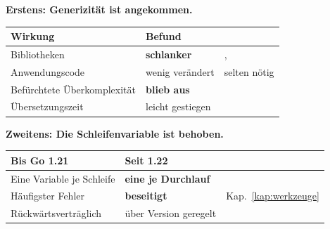 \begin{aktuell}
\textbf{Erstens: Generizität ist angekommen.}

\begin{center}
\renewcommand{\arraystretch}{1.45}
\begin{tabular}{@{}P{3.4cm}P{2.2cm}P{2.2cm}@{}}
\toprule
\textbf{Wirkung} & \textbf{Befund} & \\
\midrule
Bibliotheken & \textcolor{gruen}{\textbf{schlanker}} & , \\
Anwendungscode & \textcolor{mittel}{wenig verändert} & \textcolor{mittel}{selten nötig}\\
Befürchtete Überkomplexität & \textcolor{gruen}{\textbf{blieb aus}} & \\
Übersetzungszeit & \textcolor{mittel}{leicht gestiegen} & \\
\bottomrule
\end{tabular}
\end{center}

\begin{center}
\begin{minipage}{0.86\textwidth}
\end{minipage}
\end{center}

\medskip
\textbf{Zweitens: Die Schleifenvariable ist behoben.}

\begin{center}
\renewcommand{\arraystretch}{1.45}
\begin{tabular}{@{}P{3.0cm}P{2.2cm}P{2.6cm}@{}}
\toprule
\textbf{Bis Go 1.21} & \textbf{Seit 1.22} & \\
\midrule
Eine Variable je Schleife & \textbf{eine je Durchlauf} & \\
Häufigster Fehler & \textcolor{gruen}{\textbf{beseitigt}} & \textcolor{gruen}{Kap.~\ref{kap:werkzeuge}}\\
Rückwärts\-verträglich & \textcolor{mittel}{über Version geregelt} & \\
\bottomrule
\end{tabular}
\end{center}

\begin{center}
\end{center}


\end{aktuell}
